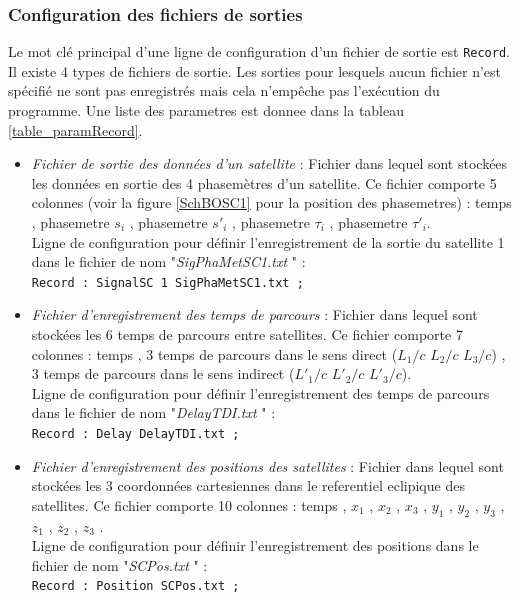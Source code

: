 \documentclass[a4paper,english,12pt]{article}
\begin{document}
\subsubsection{Configuration des fichiers de sorties}
\label{SSSConfigRecord}
Le mot cl\'e principal d'une ligne de configuration d'un fichier de sortie est \texttt{Record}. Il existe 4 types de fichiers de sortie. Les sorties pour lesquels aucun fichier n'est sp\'ecifi\'e ne sont pas enregistr\'es mais cela n'emp\^eche pas l'ex\'ecution du programme. Une liste des parametres est donnee dans la tableau \ref{table_paramRecord}.
\begin{itemize}
\item { \it Fichier de sortie des donn\'ees d'un satellite } : Fichier dans lequel sont stock\'ees les donn\'ees en sortie des 4 phasem\`etres d'un satellite. Ce fichier comporte 5 colonnes (voir la figure \ref{SchBOSC1} pour la position des phasemetres) : temps , phasemetre $s_{i}$ , phasemetre $s'_{i}$ , phasemetre $\tau_{i}$ , phasemetre $\tau'_{i}$.\\
Ligne de configuration pour d\'efinir l’enregistrement de la sortie du satellite 1 dans le fichier de nom "{\it SigPhaMetSC1.txt} " :\\
\hphantom{aaaaa}\texttt{Record : SignalSC 1 SigPhaMetSC1.txt ;}  \\
\item { \it Fichier d'enregistrement des temps de parcours } : Fichier dans lequel sont stockées les 6
temps de parcours entre satellites. Ce fichier comporte 7 colonnes : temps , 3 temps de parcours dans le sens direct  ($L_{1} / c$  $L_{2} / c$ $L_{3} / c$) ,  3 temps de parcours dans le sens indirect ($L'_{1} / c$  $L'_{2} / c$ $L'_{3} / c$).\\
Ligne de configuration pour d\'efinir l'enregistrement des temps de parcours dans le fichier de nom  "{\it DelayTDI.txt} " : \\
\hphantom{aaaaa}\texttt{Record : Delay DelayTDI.txt ;}  \\

\item { \it Fichier d'enregistrement des positions des satellites} : Fichier dans lequel sont stockées les 3 coordonn\'ees cartesiennes dans le referentiel eclipique des satellites. Ce fichier comporte 10 colonnes : temps , $x_{1}$ , $x_{2}$ , $x_{3}$ , $y_{1}$ , $y_{2}$ , $y_{3}$ , $z_{1}$ , $z_{2}$ , $z_{3}$ .\\
Ligne de configuration pour d\'efinir l'enregistrement des positions dans le fichier de nom  "{\it SCPos.txt} " :\\
\hphantom{aaaaa}\texttt{Record : Position SCPos.txt ;}  \\


\end{itemize}
\end{document}
